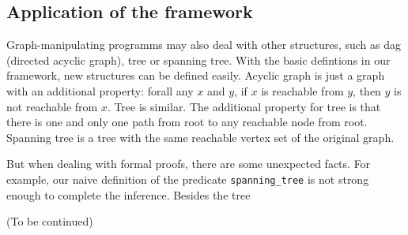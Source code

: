 \subsection{Application of the framework}

Graph-manipulating programms may also deal with other structures, such
as dag (directed acyclic graph), tree or spanning tree. With the basic
defintions in our framework, new structures can be defined
easily. Acyclic graph is just a graph with an additional property:
forall any $x$ and $y$, if $x$ is reachable from $y$, then $y$ is not
reachable from $x$. Tree is similar. The additional property for tree
is that there is one and only one path from root to any reachable node
from root. Spanning tree is a tree with the same reachable vertex set
of the original graph.

But when dealing with formal proofs, there are some unexpected
facts. For example, our naive definition of the
predicate \verb|spanning_tree| is not strong enough to complete the
inference. Besides the tree

(To be continued)
